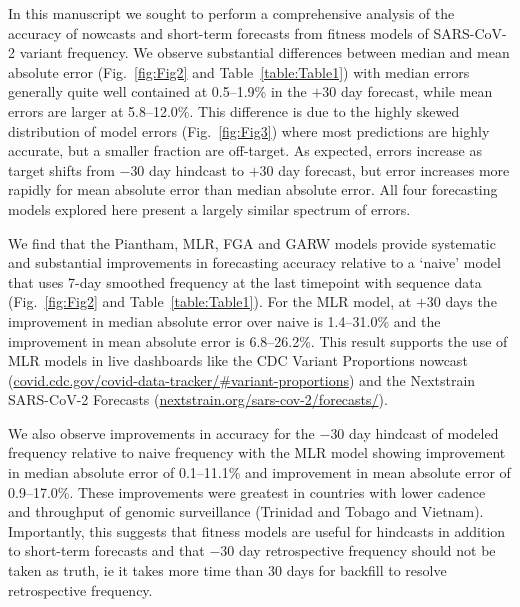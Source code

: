 In this manuscript we sought to perform a comprehensive analysis of the accuracy of nowcasts and short-term forecasts from fitness models of SARS-CoV-2 variant frequency.
We observe substantial differences between median and mean absolute error (Fig.~\ref{fig:Fig2} and Table~\ref{table:Table1}) with median errors generally quite well contained at 0.5--1.9\% in the $+30$ day forecast, while mean errors are larger at 5.8--12.0\%.
This difference is due to the highly skewed distribution of model errors (Fig.~\ref{fig:Fig3}) where most predictions are highly accurate, but a smaller fraction are off-target.
As expected, errors increase as target shifts from $-30$ day hindcast to $+30$ day forecast, but error increases more rapidly for mean absolute error than median absolute error.
All four forecasting models explored here present a largely similar spectrum of errors.


\sloppy %
We find that the Piantham, MLR, FGA and GARW models provide systematic and substantial improvements in forecasting accuracy relative to a `naive' model that uses 7-day smoothed frequency at the last timepoint with sequence data (Fig.~\ref{fig:Fig2} and Table~\ref{table:Table1}).
For the MLR model, at $+30$ days the improvement in median absolute error over naive is 1.4--31.0\% and the improvement in mean absolute error is 6.8--26.2\%.
This result supports the use of MLR models in live dashboards like the CDC Variant Proportions nowcast (\href{https://covid.cdc.gov/covid-data-tracker/\#variant-proportions}{covid.cdc.gov/covid-data-tracker/\#variant-proportions}) and the Nextstrain SARS-CoV-2 Forecasts (\href{https://nextstrain.org/sars-cov-2/forecasts/}{nextstrain.org/sars-cov-2/forecasts/}).

We also observe improvements in accuracy for the $-30$ day hindcast of modeled frequency relative to naive frequency with the MLR model showing improvement in median absolute error of 0.1--11.1\% and improvement in mean absolute error of 0.9--17.0\%.
These improvements were greatest in countries with lower cadence and throughput of genomic surveillance (Trinidad and Tobago and Vietnam).
Importantly, this suggests that fitness models are useful for hindcasts in addition to short-term forecasts and that $-30$ day retrospective frequency should not be taken as truth, ie it takes more time than 30 days for backfill to resolve retrospective frequency.


